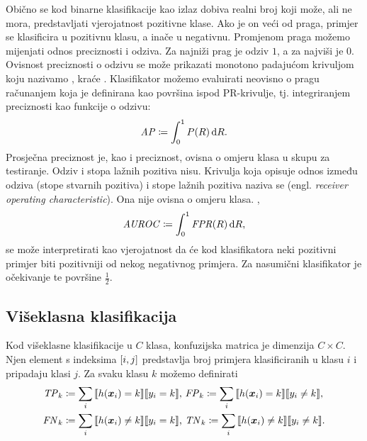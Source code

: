 \documentclass[utf8, diplomski, lmodern]{fer}
\begin{document}
Obično se kod binarne klasifikacije kao izlaz dobiva realni broj koji može, ali ne mora, predstavljati vjerojatnost pozitivne klase. Ako je on veći od praga, primjer se klasificira u pozitivnu klasu, a inače u negativnu. Promjenom praga možemo mijenjati odnos preciznosti i odziva. Za najniži prag je odziv $1$, a za najviši je $0$. Ovisnost preciznosti o odzivu se može prikazati monotono padajućom krivuljom koju nazivamo , kraće . Klasifikator možemo evaluirati neovisno o pragu računanjem  koja je definirana kao površina ispod PR-krivulje, tj. integriranjem preciznosti kao funkcije o odzivu:
\begin{align}
\mathit{AP} \coloneqq \int_0^1 P(R)\mathop{}\!\mathrm{d} R \text{.}
\end{align}
Prosječna preciznost je, kao i preciznost, ovisna o omjeru klasa u skupu za testiranje. Odziv i stopa lažnih pozitiva nisu. Krivulja koja opisuje odnos između odziva (stope stvarnih pozitiva) i stope lažnih pozitiva naziva se  (engl. \textit{receiver operating characteristic}). Ona nije ovisna o omjeru klasa. ,
\begin{align}
\mathit{AUROC} \coloneqq \int_0^1 \mathit{FPR}(R)\mathop{}\!\mathrm{d} R \text{,}
\end{align}
se može interpretirati kao vjerojatnost da će kod klasifikatora neki pozitivni primjer  biti pozitivniji od nekog negativnog primjera. Za nasumični klasifikator je očekivanje te površine $\frac{1}{2}$.

\subsection{Višeklasna klasifikacija}

Kod višeklasne klasifikacije u $C$ klasa, konfuzijska matrica je dimenzija $C\times C$. Njen element s indeksima $\sbr{i,j}$ predstavlja broj primjera klasificiranih u klasu $i$ i pripadaju klasi $j$. Za svaku klasu $k$ možemo definirati
\begin{align}
\begin{aligned}
\TP_k&\coloneqq\sum_i\enbbracket{h(\vec x_i)=k}\enbbracket{y_i=k} \text{, }
\FP_k\coloneqq\sum_i\enbbracket{h(\vec x_i)=k}\enbbracket{y_i\neq k} \text{,} \\
\FN_k&\coloneqq\sum_i\enbbracket{h(\vec x_i)\neq k}\enbbracket{y_i=k} \text{, }
\TN_k\coloneqq\sum_i\enbbracket{h(\vec x_i)\neq k}\enbbracket{y_i\neq k} \text{.}
\end{aligned}
\end{align}
\end{document}
